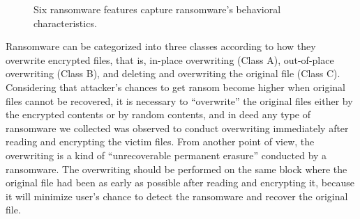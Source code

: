 \documentclass[conference]{IEEEtran}
\begin{document}
\begin{figure}[t]
\caption{Six ransomware features capture ransomware's behavioral characteristics.}\label{fig-op}
\end{figure}



Ransomware can be categorized into three classes 
according to how they overwrite encrypted files, that is, 
in-place overwriting (Class A), out-of-place overwriting (Class B), 
and deleting and overwriting the original file (Class C). 
Considering that 
attacker's chances to get ransom become higher when original files cannot be recovered,
it is necessary to ``overwrite'' the original files either by the encrypted contents
or by random contents, and in deed any type of ransomware we collected 
was observed to conduct overwriting immediately after reading and encrypting 
the victim files. From another point of view, the overwriting is a kind of 
``unrecoverable permanent erasure'' conducted by a ransomware. The overwriting should be performed 
on the same block where the original file had been as early as possible after reading
and encrypting it, because it will minimize user's chance to detect the ransomware and
recover the original file. 
\end{document}
